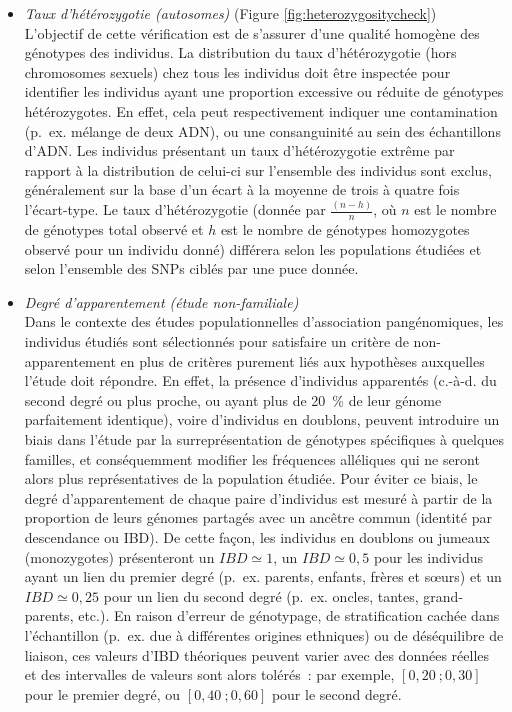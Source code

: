 \documentclass[11pt,a4paper,notrimn]{krantz}
\theoremstyle{definition}
\theoremstyle{definition}
\theoremstyle{remark}
\begin{document}
\begin{itemize}
\item
  \emph{Taux d'hétérozygotie (autosomes)} (Figure
  \ref{fig:heterozygositycheck})\\
  L'objectif de cette vérification est de s'assurer d'une qualité
  homogène des génotypes des individus. La distribution du taux
  d'hétérozygotie (hors chromosomes sexuels) chez tous les individus
  doit être inspectée pour identifier les individus ayant une proportion
  excessive ou réduite de génotypes hétérozygotes. En effet, cela peut
  respectivement indiquer une contamination (p.~ex. mélange de deux
  ADN), ou une consanguinité au sein des échantillons d'ADN. Les
  individus présentant un taux d'hétérozygotie extrême par rapport à la
  distribution de celui-ci sur l'ensemble des individus sont exclus,
  généralement sur la base d'un écart à la moyenne de trois à quatre
  fois l'écart-type. Le taux d'hétérozygotie (donnée par
  \(\frac{(n-h)}{n}\), où \(n\) est le nombre de génotypes total observé
  et \(h\) est le nombre de génotypes homozygotes observé pour un
  individu donné) différera selon les populations étudiées et selon
  l'ensemble des SNPs ciblés par une puce donnée.
\item
  \emph{Degré d'apparentement (étude non-familiale)}\\
  Dans le contexte des études populationnelles d'association
  pangénomiques, les individus étudiés sont sélectionnés pour satisfaire
  un critère de non-apparentement en plus de critères purement liés aux
  hypothèses auxquelles l'étude doit répondre. En effet, la présence
  d'individus apparentés (c.-à-d. du second degré ou plus proche, ou
  ayant plus de 20~\% de leur génome parfaitement identique), voire
  d'individus en doublons, peuvent introduire un biais dans l'étude par
  la surreprésentation de génotypes spécifiques à quelques familles, et
  conséquemment modifier les fréquences alléliques qui ne seront alors
  plus représentatives de la population étudiée. Pour éviter ce biais,
  le degré d'apparentement de chaque paire d'individus est mesuré à
  partir de la proportion de leurs génomes partagés avec un ancêtre
  commun (identité par descendance ou IBD). De cette façon, les
  individus en doublons ou jumeaux (monozygotes) présenteront un
  \(IBD\simeq 1\), un \(IBD\simeq 0,5\) pour les individus ayant un lien
  du premier degré (p.~ex. parents, enfants, frères et sœurs) et un
  \(IBD\simeq 0,25\) pour un lien du second degré (p.~ex. oncles,
  tantes, grand-parents, etc.). En raison d'erreur de génotypage, de
  stratification cachée dans l'échantillon (p.~ex. due à différentes
  origines ethniques) ou de déséquilibre de liaison, ces valeurs d'IBD
  théoriques peuvent varier avec des données réelles et des intervalles
  de valeurs sont alors tolérés~: par exemple, \([0,20\ ; 0,30]\) pour
  le premier degré, ou \([0,40\ ; 0,60]\) pour le second degré.
\end{itemize}
\end{document}
